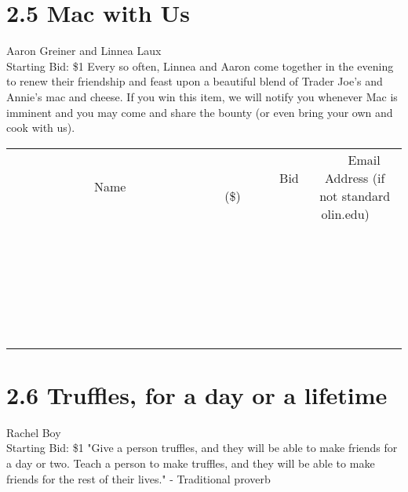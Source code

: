 \documentclass[11pt]{article}
\begin{document}
\section*{2.5 Mac with Us}
Aaron Greiner and Linnea Laux
\\
Starting Bid: \$1
\newline
Every so often, Linnea and Aaron come together in the evening to renew their friendship and feast upon a beautiful blend of Trader Joe's and Annie's mac and cheese. If you win this item, we will notify you whenever Mac is imminent and you may come and share the bounty (or even bring your own and cook with us).
\\[6ex]
\begin{tabular}{c c c}
~~~~~~~~~~~~~Name~~~~~~~~~~~~~ & ~~~~~~~~~Bid (\$)~~~~~~~~~  & ~~~Email Address (if not standard olin.edu)~~~\\
 & & \\
\hline
 & & \\
\hline
 & & \\
\hline
 & & \\
\hline
 & & \\
\hline
 & & \\
\hline
 & & \\
\hline
 & & \\
\hline
 & & \\
\hline
 & & \\
\hline
 & & \\
\hline
 & & \\
\hline
 & & \\
\hline
 & & \\
\hline
 & & \\
\hline
 & & \\
\hline
 & & \\
\hline
 & & \\
\hline
 & & \\
\hline
 & & \\
\hline
 & & \\
\hline
 & & \\
\hline
 & & \\
\hline
 & & \\
\hline
 & & \\
\hline
 & & \\
\hline
\end{tabular}
\newpage
\section*{2.6 Truffles, for a day or a lifetime}
Rachel Boy
\\
Starting Bid: \$1
\newline
"Give a person truffles, and they will be able to make friends for a day or two. Teach a person to make truffles, and they will be able to make friends for the rest of their lives."
- Traditional proverb
\end{document}
